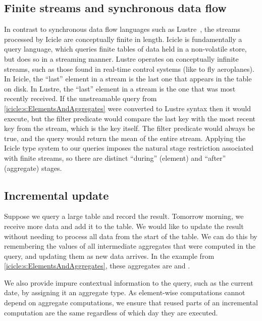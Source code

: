 \subsection{Finite streams and synchronous data flow}
In contrast to synchronous data flow languages such as {\sc Lustre}~\cite{halbwachs1991synchronous}, the streams processed by Icicle are conceptually finite in length.
Icicle is fundamentally a query language, which queries finite tables of data held in a non-volatile store, but does so in a streaming manner.
{\sc Lustre} operates on conceptually infinite streams, such as those found in real-time control systems (like to fly aeroplanes).
In Icicle, the ``last'' element in a stream is the last one that appears in the table on disk.
In {\sc Lustre}, the ``last'' element in a stream is the one that was most recently received.
If the unstreamable query from \cref{icicle:s:ElementsAndAggregates} were converted to {\sc Lustre} syntax then it would execute, but the filter predicate would compare the last key with the most recent key from the stream, which is the key itself.
The filter predicate would always be true, and the query would return the mean of the entire stream.
Applying the Icicle type system to our queries imposes the natural stage restriction associated with finite streams, so there are distinct ``during'' (element) and ``after'' (aggregate) stages.


\subsection{Incremental update}
Suppose we query a large table and record the result.
Tomorrow morning, we receive more data and add it to the table.
We would like to update the result without needing to process all data from the start of the table.
We can do this by remembering the values of all intermediate aggregates that were computed in the query, and updating them as new data arrives.
In the \Ic@meanOfLatest@ example from \cref{icicle:s:ElementsAndAggregates}, these aggregates are \Ic@k@ and \Ic@avgs@. 

We also provide impure contextual information to the query, such as the current date, by assigning it an aggregate type.
As element-wise computations cannot depend on aggregate computations, we ensure that reused parts of an incremental computation are the same regardless of which day they are executed.


